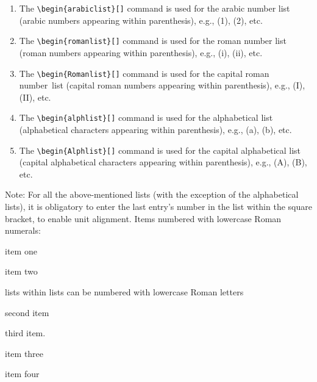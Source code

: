 \begin{enumerate}
\item The \verb|\begin{arabiclist}[]| command is used for the arabic
number list (arabic numbers appearing within parenthesis), e.g., (1),
(2), etc.

\smallskip

\item The \verb|\begin{romanlist}[]| command is used for the roman
number list (roman numbers appearing within parenthesis), e.g., (i),
(ii), etc.

\smallskip

\item The \verb|\begin{Romanlist}[]| command is used for the capital roman
\hbox{number list} (capital roman numbers appearing within parenthesis),
e.g., (I), (II), etc.

\smallskip

\item The \verb|\begin{alphlist}[]| command is used for the alphabetical
list (alphabetical characters appearing within parenthesis),
e.g., (a), (b), etc.

\smallskip

\item The \verb|\begin{Alphlist}[]| command is used for the capital
alphabetical list (capital alphabetical characters appearing within
parenthesis), e.g., (A), (B), etc.
\end{enumerate}

Note: For all the above-mentioned lists (with the exception of
the alphabetical lists), it is obligatory to enter the last
entry's number in the list within the square bracket, to enable unit
alignment. Items numbered with lowercase Roman numerals:

\begin{romanlist}[(iii)]
\item item one
\item item two
    \begin{alphlist}[(a)]
    \item lists within lists can be numbered with lowercase Roman letters
    \item second item
    \item third item.
    \end{alphlist}
\item item three
\item item four
\end{romanlist}

